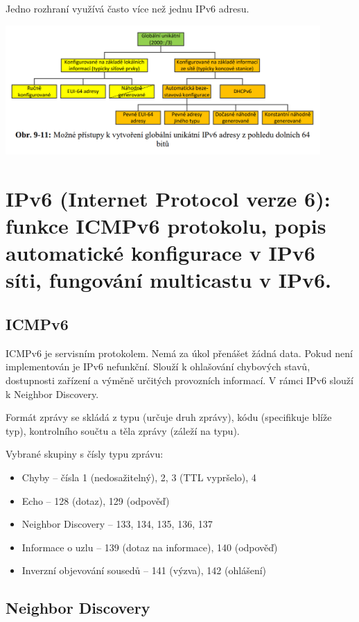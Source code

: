 Jedno rozhraní využívá často více než jednu IPv6 adresu.

\begin{center}
	\includegraphics[width=0.9\textwidth]{obrazky/071.png}
\end{center}


\clearpage
\section{IPv6 (Internet Protocol verze 6): funkce ICMPv6 protokolu, popis automatické konfigurace v IPv6 síti, fungování multicastu v IPv6.}

\subsection{ICMPv6}

ICMPv6 je servisním protokolem.
Nemá za úkol přenášet žádná data.
Pokud není implementován je IPv6 nefunkční.
Slouží k ohlašování chybových stavů, dostupnosti zařízení a výměně určitých provozních informací.
V rámci IPv6 slouží k Neighbor Discovery.

Formát zprávy se skládá z typu (určuje druh zprávy), kódu (specifikuje blíže typ), kontrolního součtu a těla zprávy (záleží na typu).

Vybrané skupiny s čísly typu zprávu:
\begin{itemize}[noitemsep]
    \item Chyby -- čísla 1 (nedosažitelný), 2, 3 (TTL vypršelo), 4
    \item Echo -- 128 (dotaz), 129 (odpověď)
    \item Neighbor Discovery -- 133, 134, 135, 136, 137
    \item Informace o uzlu -- 139 (dotaz na informace), 140 (odpověď)
    \item Inverzní objevování sousedů -- 141 (výzva), 142 (ohlášení)
\end{itemize}

\subsection{Neighbor Discovery}

